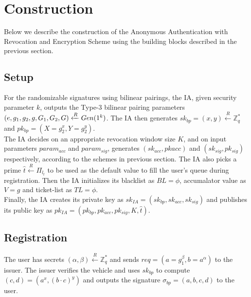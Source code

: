 \documentclass[12pt]{article}
\newcommand{\rIn}{\xleftarrow{R}}
\begin{document}
\section{Construction}
Below we describe the construction of the Anonymous Authentication with Revocation and Encryption Scheme using the building blocks described in the previous section.


\subsection{Setup}
For the randomizable signatures using bilinear pairings, the IA, given security parameter $k$, outputs the Type-3 bilinear pairing parameters $(e, g_1, g_2, g, G_1,\\ G_2, G) \rIn Gen(1^k)$. The IA then generates $sk_{bp} = (x, y) \rIn \mathbb{Z}_q^*$ and $pk_{bp} = (X = g_2^x, Y = g_2^y)$. \\

The IA decides on an appropriate revocation window size $K$, and on input parameters $param_{acc}$ and $param_{sig}$, generates $(sk_{acc}, pk{acc})$ and $(sk_{sig}, pk_{sig})$ respectively, according to the schemes in previous section. The IA also picks a prime $\hat{t} \rIn \Pi_{l_t}$ to be used as the default value to fill the user's queue during registration. Then the IA initializes its blacklist as $BL = \phi$, accumalator value as $V = g$ and ticket-list as $TL = \phi$.\\

Finally, the IA creates its private key as $sk_{IA} = (sk_{bp}, sk_{acc}, sk_{sig})$ and publishes its public key as $pk_{IA} = (pk_{bp}, pk_{acc}, pk_{sig}, K, \hat{t})$.


\subsection{Registration}
The user has secrets $(\alpha, \beta) \rIn \mathbb{Z}_q^*$ and sends $req = (a = g_1^\beta, b = a^\alpha)$ to the issuer. The issuer verifies the vehicle and uses $sk_{bp}$ to compute $(c, d) = (a^x, (b\cdot c)^y)$ and outputs the signature $\sigma_{bp} = (a,b,c,d)$ to the user.\\
\end{document}
